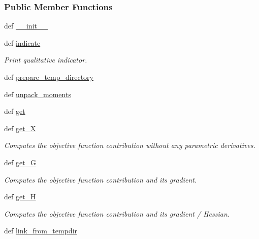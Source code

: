 \subsubsection*{Public Member Functions}
\begin{DoxyCompactItemize}
\item 
def \hyperlink{classforcebalance_1_1gmxqpio_1_1Monomer__QTPIE_a04abd6d3a1b39bb9f40bb1d8d2fc778a}{\-\_\-\-\_\-init\-\_\-\-\_\-}
\item 
def \hyperlink{classforcebalance_1_1gmxqpio_1_1Monomer__QTPIE_a6e011efa83d96e3e13eb7ea6434ef634}{indicate}
\begin{DoxyCompactList}\small\item\em Print qualitative indicator. \end{DoxyCompactList}\item 
def \hyperlink{classforcebalance_1_1gmxqpio_1_1Monomer__QTPIE_a0a859c87a87d4021e61ada64fdce4ebd}{prepare\-\_\-temp\-\_\-directory}
\item 
def \hyperlink{classforcebalance_1_1gmxqpio_1_1Monomer__QTPIE_ac227bf1f1ed6d579fea2eeda64c389cb}{unpack\-\_\-moments}
\item 
def \hyperlink{classforcebalance_1_1gmxqpio_1_1Monomer__QTPIE_a46144411b5166a1839bf954b584ca3a7}{get}
\item 
def \hyperlink{classforcebalance_1_1target_1_1Target_a606dd136f195c267c05a2455405e5949}{get\-\_\-\-X}
\begin{DoxyCompactList}\small\item\em Computes the objective function contribution without any parametric derivatives. \end{DoxyCompactList}\item 
def \hyperlink{classforcebalance_1_1target_1_1Target_afa8cc38c8bba8861c072e789717aa049}{get\-\_\-\-G}
\begin{DoxyCompactList}\small\item\em Computes the objective function contribution and its gradient. \end{DoxyCompactList}\item 
def \hyperlink{classforcebalance_1_1target_1_1Target_a1d2ee27fe86a09769c1816af23b09adb}{get\-\_\-\-H}
\begin{DoxyCompactList}\small\item\em Computes the objective function contribution and its gradient / Hessian. \end{DoxyCompactList}\item 
def \hyperlink{classforcebalance_1_1target_1_1Target_a5aa4958cea0a48138511567a076c5a82}{link\-\_\-from\-\_\-tempdir}

\end{DoxyCompactItemize}
